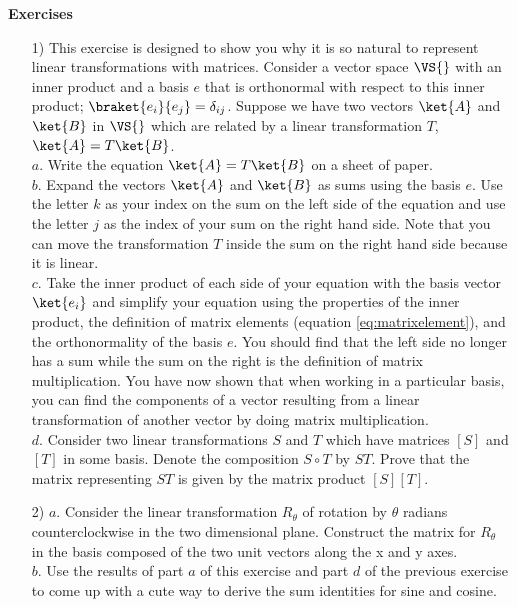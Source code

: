 \begin{flushleft}\textbf{Exercises}\end{flushleft}
\begin{itemize}
\item[1)] This exercise is designed to show you why it is so natural to represent linear transformations with matrices.  Consider a vector space $\VS{}$ with an inner product and a basis $e$ that is orthonormal with respect to this inner product; $\braket{e_i}{e_j}=\delta_{ij}$.  Suppose we have two vectors $\ket{A}$ and $\ket{B}$ in $\VS{}$ which are related by a linear transformation $T$, \mbox{$\ket{A} = T\ket{B}$.}\\
$a$. Write the equation $\ket{A} = T\ket{B}$ on a sheet of paper.\\
$b$. Expand the vectors $\ket{A}$ and $\ket{B}$ as sums using the basis $e$.  Use the letter $k$ as your index on the sum on the left side of the equation and use the letter $j$ as the index of your sum on the right hand side.  Note that you can move the transformation $T$ inside the sum on the right hand side because it is linear.\\
$c$. Take the inner product of each side of your equation with the basis vector $\ket{e_i}$ and simplify your equation using the properties of the inner product, the definition of matrix elements (equation \ref{eq:matrixelement}), and the orthonormality of the basis $e$.  You should find that the left side no longer has a sum while the sum on the right is the definition of matrix multiplication. You have now shown that when working in a particular basis, you can find the components of a vector resulting from a linear transformation of another vector by doing matrix multiplication. \\
$d$. Consider two linear transformations $S$ and $T$ which have matrices $[S]$ and $[T]$ in some basis.  Denote the composition $S \circ T$ by $ST$.  Prove that the matrix representing $ST$ is given by the matrix product $[S][T]$.
\item[2)] $a$. Consider the linear transformation $R_{\theta}$ of rotation by $\theta$ radians counterclockwise in the two dimensional plane.  Construct the matrix for $R_{\theta}$ in the basis composed of the two unit vectors along the x and y axes.\\$b$.  Use the results of part $a$ of this exercise and part $d$ of the previous exercise to come up with a cute way to derive the sum identities for sine and cosine.
\end{itemize}
